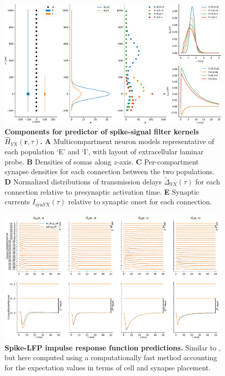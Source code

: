 \begin{figure}[!ht]
\begin{center}
\includegraphics[width=\textwidth]{Figures/Ch-LFPy/Ch-LFPy-ratepredictor.pdf}
\end{center}
\caption{\textbf{Components for predictor of spike-signal filter kernels $\hat{H}_{YX}(\mathbf{r}, \tau)$.}
{\bf A} Multicompartment neuron models representative of each population `E' and `I',
with layout of extracellular laminar probe.
{\bf B} Densities of somas along $z$-axis.
{\bf C} Per-compartment synapse densities for each connection between the two populations.
{\bf D} Normalized distributions of transmission delays $\widetilde{\Delta}_{YX} (\tau)$ for each connection relative to presynaptic activation time.
{\bf E} Synaptic currents $I_{\mathrm{syn}YX}(\tau)$ relative to synaptic onset for each connection.
}
\label{fig:LFPy_kernel_predictor}
\end{figure}




\begin{figure}[!ht]
\begin{center}
\includegraphics[width=\textwidth]{Figures/Ch-LFPy/Ch-LFPy-kernel_approx.pdf}
\end{center}
\caption{\textbf{Spike-LFP impulse response function predictions.}
Similar to ,
but here computed using a computationally fast method accounting for the expectation values in terms of cell and synapse placement.
}
\label{fig:LFPy_kernel_predictions}
\end{figure}


